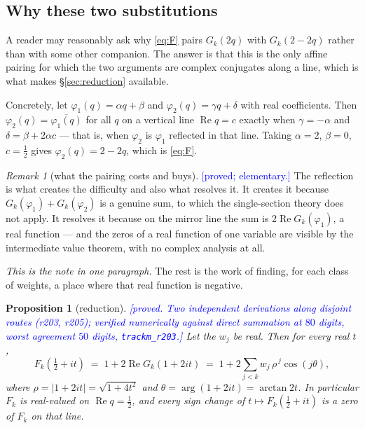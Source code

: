 \documentclass[11pt,a4paper]{article}
\theoremstyle{plain}
\newtheorem{proposition}[theorem]{Proposition}
\theoremstyle{definition}
\theoremstyle{remark}
\newtheorem{remark}[theorem]{Remark}
\newcommand{\STATUS}[1]{\textcolor{blue}{\textsf{[#1]}}}
\begin{document}
\subsection{Why these two substitutions}\label{sec:whytwo}

A reader may reasonably ask why \eqref{eq:F} pairs $G_k(2q)$ with $G_k(2-2q)$ rather than
with some other companion. The answer is that this is the only affine pairing for which
the two arguments are complex conjugates along a line, which is what makes
\S\ref{sec:reduction} available.

Concretely, let $\varphi_1(q)=\alpha q+\beta$ and $\varphi_2(q)=\gamma q+\delta$ with
real coefficients. Then $\varphi_2(q)=\overline{\varphi_1(q)}$ for all $q$ on a vertical
line $\operatorname{Re}q=c$ exactly when $\gamma=-\alpha$ and
$\delta=\beta+2\alpha c$ --- that is, when $\varphi_2$ is $\varphi_1$ reflected in that
line. Taking $\alpha=2$, $\beta=0$, $c=\tfrac12$ gives $\varphi_2(q)=2-2q$, which is
\eqref{eq:F}.

\begin{remark}[what the pairing costs and buys]\label{rem:pairing}
\STATUS{proved; elementary.}
The reflection is what creates the difficulty and also what resolves it. It creates it
because $G_k(\varphi_1)+G_k(\varphi_2)$ is a genuine sum, to which the single-section
theory does not apply. It resolves it because on the mirror line the sum is
$2\operatorname{Re}G_k(\varphi_1)$, a real function --- and the zeros of a real function
of one variable are visible by the intermediate value theorem, with no complex analysis
at all.
\end{remark}

\emph{This is the note in one paragraph.} The rest is the work of finding, for each class
of weights, a place where that real function is negative.



\begin{proposition}[reduction]\label{prop:real}
\STATUS{proved. Two independent derivations along disjoint routes (r203, r205);
verified numerically against direct summation at $80$ digits, worst agreement
$50$ digits, \texttt{trackm\_r203}.}
Let the $w_j$ be real. Then for every real $t$,
\[
  F_k\!\left(\tfrac12+it\right)\;=\;1+2\operatorname{Re}G_k(1+2it)
  \;=\;1+2\sum_{j<k}w_j\,\rho^{\,j}\cos(j\theta),
\]
where $\rho=|1+2it|=\sqrt{1+4t^{2}}$ and $\theta=\arg(1+2it)=\arctan 2t$. In particular
$F_k$ is real-valued on $\operatorname{Re}q=\tfrac12$, and every sign change of
$t\mapsto F_k(\tfrac12+it)$ is a zero of $F_k$ on that line.
\end{proposition}
\end{document}
